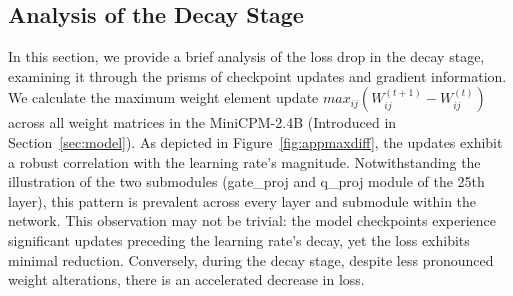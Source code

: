 

\subsection{Analysis of the Decay Stage}
In this section, we provide a brief analysis of the loss drop in the decay stage, examining it through the prisms of checkpoint updates and gradient information.  We calculate the maximum weight element update $max_{ij} (W_{ij}^{(t+1)} - W_{ij}^{(t)})$ across all weight matrices in the MiniCPM-2.4B (Introduced in Section~\ref{sec:model}). As depicted in Figure~\ref{fig:appmaxdiff}, the updates exhibit a robust correlation with the learning rate's magnitude. Notwithstanding the illustration of the two submodules (gate\_proj and q\_proj module of the 25th layer), this pattern is prevalent across every layer and submodule within the network. This observation may not be trivial: the model checkpoints experience significant updates preceding the learning rate's decay, yet the loss exhibits minimal reduction. Conversely, during the decay stage, despite less pronounced weight alterations, there is an accelerated decrease in loss.  


